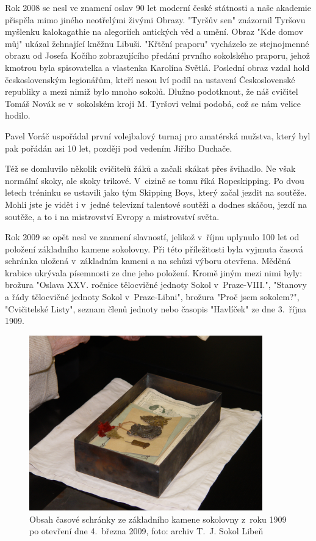 \documentclass[a5paper, 11pt, twoside]{article}
\begin{document}
Rok 2008 se nesl ve znamení oslav 90 let moderní české státnosti a naše
akademie přispěla mimo jiného neotřelými živými Obrazy. "Tyršův sen"
znázornil Tyršovu myšlenku kalokagathie na alegoriích antických věd a
umění. Obraz "Kde domov můj" ukázal žehnající kněžnu Libuši. "Křtění
praporu" vycházelo ze stejnojmenné obrazu od Josefa Kočího
zobrazujícího předání prvního sokolského praporu, jehož kmotrou byla
spisovatelka a vlastenka Karolína Světlá. Poslední obraz vzdal hold
československým legionářům, kteří nesou lví podíl na ustavení
Československé republiky a mezi nimiž bylo mnoho sokolů. Dlužno
podotknout, že náš cvičitel Tomáš Novák se v~sokolském kroji M. Tyršovi
velmi podobá, což se nám velice hodilo.

Pavel Voráč uspořádal první volejbalový turnaj pro amatérská mužstva,
který byl pak pořádán asi 10 let, později pod vedením Jiřího Duchače.

Též se domluvilo několik cvičitelů žáků a začali skákat přes švihadlo.
Ne však normální skoky, ale skoky trikové. V~cizině se tomu říká
Ropeskipping. Po dvou letech tréninku se ustavili jako tým Skipping
Boys, který začal jezdit na soutěže. Mohli jste je vidět i v~jedné
televizní talentové soutěži a dodnes skáčou, jezdí na soutěže, a to i na
mistrovství Evropy a mistrovství světa.

Rok 2009 se opět nesl ve znamení slavností, jelikož v~říjnu uplynulo 100
let od položení základního kamene sokolovny. Při této příležitosti byla
vyjmuta časová schránka uložená v~základním kameni a na schůzi výboru
otevřena. Měděná krabice ukrývala písemnosti ze dne jeho položení. Kromě
jiným mezi nimi byly: brožura "Oslava XXV. ročnice tělocvičné jednoty
Sokol v~Praze-VIII.", "Stanovy a řády tělocvičné jednoty Sokol
v~Praze-Libni", brožura "Proč jsem sokolem?", "Cvičitelské Listy",
seznam členů jednoty nebo časopis "Havlíček" ze dne 3.~října 1909.

\begin{figure}[h]
  \centering 
  \includegraphics[width=0.9\textwidth]{img/58_schranka.JPG}
  \caption*{Obsah časové schránky ze základního kamene sokolovny z~roku 1909
  po otevření dne 4.~března 2009, foto: archiv T.~J. Sokol Libeň}
\end{figure}
\end{document}
